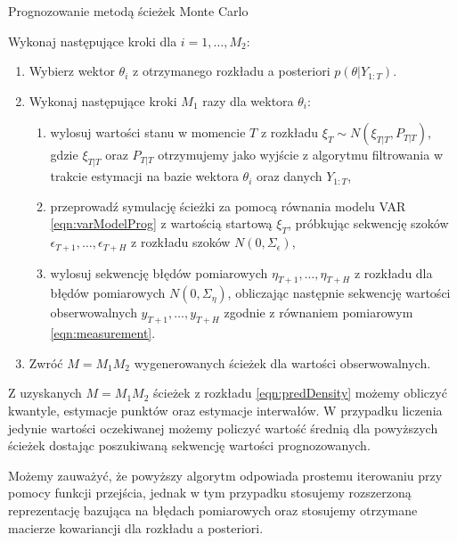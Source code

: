\begin{algDefinition}{Prognozowanie metodą ścieżek Monte Carlo}

Wykonaj następujące kroki dla $i = 1, \dots, M_2$:

\begin{enumerate}
    \item Wybierz wektor $\theta_i$ z otrzymanego rozkładu a posteriori $p(\theta|Y_{1:T})$.
    \item Wykonaj następujące kroki $M_1$ razy dla wektora $\theta_i$:
    \begin{enumerate}
        \item wylosuj wartości stanu w momencie $T$ z rozkładu $\xi_T \sim N(\xi_{T|T}, P_{T|T})$, gdzie $\xi_{T|T}$ oraz $P_{T|T}$ otrzymujemy jako wyjście z algorytmu filtrowania w trakcie estymacji na bazie wektora $\theta_i$ oraz danych $Y_{1:T}$,
        \item przeprowadź symulację ścieżki za pomocą równania modelu VAR \ref{eqn:varModelProg} z wartością startową $\xi_T$, próbkując sekwencję szoków $\epsilon_{T+1}, \dots, \epsilon_{T+H}$ z rozkładu szoków $N(0, \Sigma_\epsilon)$,
        \item wylosuj sekwencję błędów pomiarowych $\eta_{T+1}, \dots, \eta_{T+H}$ z rozkładu dla błędów pomiarowych $N(0, \Sigma_\eta)$, obliczając następnie sekwencję wartości obserwowalnych $y_{T+1}, \dots, y_{T+H}$ zgodnie z równaniem pomiarowym \eqref{eqn:measurement}.
    \end{enumerate}
    \item Zwróć $M = M_1 M_2$ wygenerowanych ścieżek dla wartości obserwowalnych.
\end{enumerate}
    
\end{algDefinition}

Z uzyskanych $M = M_1 M_2$ ścieżek z rozkładu \eqref{eqn:predDensity} możemy obliczyć kwantyle, estymacje punktów oraz estymacje interwałów. W przypadku liczenia jedynie wartości oczekiwanej możemy policzyć wartość średnią dla powyższych ścieżek dostając poszukiwaną sekwencję wartości prognozowanych. 

Możemy zauważyć, że powyższy algorytm odpowiada prostemu iterowaniu przy pomocy funkcji przejścia, jednak w tym przypadku stosujemy rozszerzoną reprezentację bazująca na błędach pomiarowych oraz stosujemy otrzymane macierze kowariancji dla rozkładu a posteriori.




